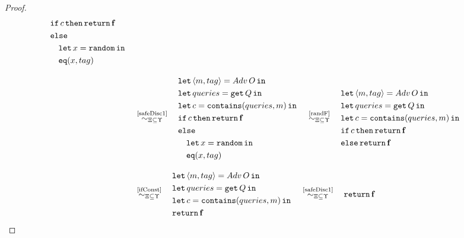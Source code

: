 \begin{proof}
{\begin{align*}
\begin{aligned}
        & \mathtt{if}\, c\, \mathtt{then} \, \mathtt{return}\, \mathbf{f} \\
        &\mathtt{else} \\
        &\quad \mathtt{let}\,x = \mathtt{random}\,\mathtt{in}\, \\
        &\quad \mathtt{eq}(x,tag)
    \end{aligned}
    \\[2ex]
    &\quad\overset{\text{\ref{safeDisc1}}}{\sim_{\Xi\subseteq\Upsilon}}\quad
    \begin{aligned}
        &\mathtt{let}\,\langle m,tag \rangle = Adv\,O\,\mathtt{in}\, \\
        &\mathtt{let}\,queries = \mathtt{get}\, Q\,\mathtt{in}\, \\
        &\mathtt{let}\,c=\mathtt{contains}(queries, m)\,\mathtt{in}\, \\
        & \mathtt{if}\, c\, \mathtt{then} \, \mathtt{return}\, \mathbf{f} \\
        &\mathtt{else} \\
        &\quad \mathtt{let}\,x = \mathtt{random}\,\mathtt{in}\, \\
        &\quad \mathtt{eq}(x,tag)
    \end{aligned}
    \quad\overset{\text{\ref{randF}}}{\sim_{\Xi\subseteq\Upsilon}}\quad
    \begin{aligned}
        &\mathtt{let}\,\langle m,tag \rangle = Adv\,O\,\mathtt{in}\, \\
        &\mathtt{let}\,queries = \mathtt{get}\, Q\,\mathtt{in}\, \\
        &\mathtt{let}\,c=\mathtt{contains}(queries, m)\,\mathtt{in}\, \\
        & \mathtt{if}\, c\, \mathtt{then} \, \mathtt{return}\, \mathbf{f} \\
        &\mathtt{else} \, \mathtt{return}\, \mathbf{f}
    \end{aligned}
    \\[2ex]
    &\quad\overset{\text{\ref{ifConst}}}{\sim_{\Xi\subseteq\Upsilon}}\quad
    \begin{aligned}
        &\mathtt{let}\,\langle m,tag \rangle = Adv\,O\,\mathtt{in}\, \\
        &\mathtt{let}\,queries = \mathtt{get}\, Q\,\mathtt{in}\, \\
        &\mathtt{let}\,c=\mathtt{contains}(queries, m)\,\mathtt{in}\, \\
        & \mathtt{return}\, \mathbf{f}
    \end{aligned}
    \quad\overset{\text{\ref{safeDisc1}}}{\sim_{\Xi\subseteq\Upsilon}}\quad
    \begin{aligned}
        &\mathtt{return}\, \mathbf{f}
    \end{aligned}
\end{align*}
}
\end{proof}

